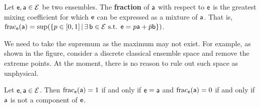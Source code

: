 \begin{mathSection}
	\begin{defn}
		Let $\ens, \ens[a] \in \Ens$ be two ensembles. The \textbf{fraction} of $\ens[a]$ with respect to $\ens$ is the greatest mixing coefficient for which $\ens$ can be expressed as a mixture of $\ens[a]$. That is, $\fraction_{\ens}(\ens[a]) = \sup(\{ p \in [0,1] \, | \, \exists \, \ens[b] \in \Ens \text{ s.t. }  \ens = p \ens[a] + \bar{p} \ens[b] \})$.
	\end{defn}

\begin{figure}[H]
	\centering
\end{figure}
	
	\begin{remark}
		We need to take the supremum as the maximum may not exist. For example, as shown in the figure, consider a discrete classical ensemble space and remove the extreme points. At the moment, there is no reason to rule out such space as unphysical.
	\end{remark}
	
	\begin{prop}\label{pm-es-fractionOneZero}
		Let $\ens, \ens[a] \in \Ens$. Then $\fraction_{\ens}(\ens[a]) = 1$ if and only if $\ens = \ens[a]$ and $\fraction_{\ens}(\ens[a]) = 0$ if and only if $\ens[a]$ is not a component of $\ens$.
	\end{prop}
	

\end{mathSection}
